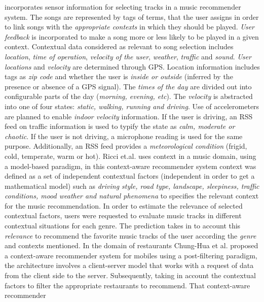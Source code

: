 incorporates sensor information for selecting tracks in a music recommender system.
The songs are represented by tags of terms, that the user assigns in order to link
songs with the \textit{appropriate contexts} in which they should be played.
\textit{User feedback} is incorporated to make a song more or less likely to be
played in a given context. Contextual data considered as relevant to song selection
includes \textit{location}, \textit{time of operation}, \textit{velocity of the user}, 
\textit{weather}, \textit{traffic} and \textit{sound}. \textit{User locations} and 
\textit{velocity} are determined through GPS.
Location information includes tags as \textit{zip code} and whether the
user is \textit{inside or outside} (inferred by the presence or absence of a
GPS signal). The \textit{times of the day} are divided out into configurable
parts of the day (\textit{morning, evening, etc}). The \textit{velocity} is 
abstracted into one of four states: \textit{static, walking, running and driving}.  
Use of accelerometers are planned to enable \textit{indoor velocity}
information. If the user is driving, an RSS feed on traffic information 
is used to typify the state as \textit{calm, moderate or chaotic}. If the user is not
driving, a microphone reading is used for the same purpose.
Additionally, an RSS feed provides a \textit{meteorological condition} (frigid,
cold, temperate, warm or hot).
Ricci et.al. \cite{baltrunas2011incarmusic} uses
context in a music domain, using a model-based paradigm, in this
context-aware recommender system context was defined as a set of
independent contextual factors (independent in order to get a
mathematical model) such as \textit{driving style, road type,
landscape, sleepiness, traffic conditions, mood weather and natural
phenomena} to specifies the relevant context for the music
recommendation. In order to estimate the relevance of selected
contextual factors, users were requested to evaluate music tracks
in different contextual situations for each genre. The prediction
takes in to account this \textit{relevance} to recommend the favorite
music tracks of the user according the \textit{genre} and contexts mentioned.
In the domain of restaurants Chung-Hua et al. \cite{chu2013chinese} proposed a
context-aware recommender system for mobiles using a post-filtering
paradigm, the architecture involves a  client-server model that works
with a request of data from the client side to the server.
Subsequently, taking in account the contextual factors to filter the
appropriate restaurants to recommend. That context-aware recommender
